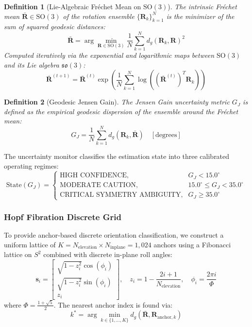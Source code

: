 \documentclass[conference]{IEEEtran}
\newtheorem{definition}{Definition}
\begin{document}
\begin{definition}[Lie-Algebraic Fréchet Mean on $\mathrm{SO}(3)$]
The intrinsic Fréchet mean $\bar{\mathbf{R}} \in \mathrm{SO}(3)$ of the rotation ensemble $\{\mathbf{R}_k\}_{k=1}^N$ is the minimizer of the sum of squared geodesic distances:
\begin{equation}
\bar{\mathbf{R}} = \arg\min_{\mathbf{R} \in \mathrm{SO}(3)} \frac{1}{N} \sum_{k=1}^N d_g(\mathbf{R}_k, \mathbf{R})^2
\end{equation}
Computed iteratively via the exponential and logarithmic maps between $\mathrm{SO}(3)$ and its Lie algebra $\mathfrak{so}(3)$:
\begin{equation}
\bar{\mathbf{R}}^{(t+1)} = \bar{\mathbf{R}}^{(t)} \exp\left( \frac{1}{N} \sum_{k=1}^N \log\left( (\bar{\mathbf{R}}^{(t)})^T \mathbf{R}_k \right) \right)
\end{equation}
\end{definition}

\begin{definition}[Geodesic Jensen Gain]
The Jensen Gain uncertainty metric $G_J$ is defined as the empirical geodesic dispersion of the ensemble around the Fréchet mean:
\begin{equation}
G_J = \frac{1}{N} \sum_{k=1}^N d_g(\mathbf{R}_k, \bar{\mathbf{R}}) \quad [\text{degrees}]
\label{eq:jensen_gain}
\end{equation}
\end{definition}

The uncertainty monitor classifies the estimation state into three calibrated operating regimes:
\begin{equation}
\text{State}(G_J) = \begin{cases} 
\text{HIGH CONFIDENCE}, & G_J < 15.0^\circ \\
\text{MODERATE CAUTION}, & 15.0^\circ \le G_J < 35.0^\circ \\
\text{CRITICAL SYMMETRY AMBIGUITY}, & G_J \ge 35.0^\circ
\end{cases}
\end{equation}

\subsubsection{Hopf Fibration Discrete Grid}
To provide anchor-based discrete orientation classification, we construct a uniform lattice of $K = N_{\text{elevation}} \times N_{\text{inplane}} = 1,024$ anchors using a Fibonacci lattice on $S^2$ combined with discrete in-plane roll angles:
\begin{equation}
\mathbf{s}_i = \begin{bmatrix} \sqrt{1 - z_i^2}\cos(\phi_i) \\ \sqrt{1 - z_i^2}\sin(\phi_i) \\ z_i \end{bmatrix}, \quad z_i = 1 - \frac{2i+1}{N_{\text{elevation}}}, \quad \phi_i = \frac{2\pi i}{\Phi}
\end{equation}
where $\Phi = \frac{1+\sqrt{5}}{2}$. The nearest anchor index is found via:
\begin{equation}
k^* = \arg\min_{k \in \{1, \dots, K\}} d_g(\bar{\mathbf{R}}, \mathbf{R}_{\text{anchor}, k})
\end{equation}
\end{document}
